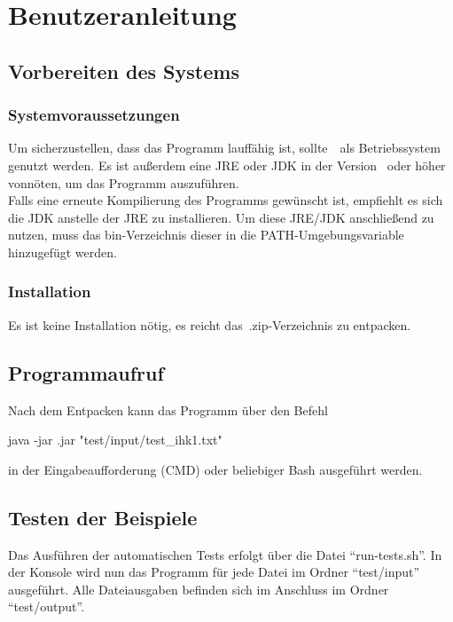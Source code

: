\chapter{Benutzeranleitung}\label{ch:benutzeranleitung}


\section{Vorbereiten des Systems}\label{sec:vorbereiten-des-systems}

\subsection{Systemvoraussetzungen}\label{subsec:systemvoraussetzungen}
Um sicherzustellen, dass das Programm lauffähig ist, sollte~\Betriebssystem~als Betriebssystem genutzt werden.
Es ist außerdem eine JRE oder JDK in der Version \JavaVersion~oder höher vonnöten, um das Programm auszuführen.\\
Falls eine erneute Kompilierung des Programms gewünscht ist, empfiehlt es sich die JDK anstelle der JRE zu installieren.
Um diese JRE/JDK anschließend zu nutzen, muss das bin-Verzeichnis dieser in die PATH-Umgebungsvariable hinzugefügt werden.
\subsection{Installation}\label{subsec:installation}
Es ist keine Installation nötig, es reicht das~.zip-Verzeichnis zu entpacken.

\section{Programmaufruf}\label{sec:programmaufruf}
Nach dem Entpacken kann das Programm über den Befehl
\begin{center}
    \colorbox{gray!20}{
        \begin{minipage}{0.9\textwidth}
            java -jar \Artifact.jar "test/input/test\_ihk1.txt"
        \end{minipage}
    }
\end{center}
in der Eingabeaufforderung (CMD) oder beliebiger Bash ausgeführt werden.
\section{Testen der Beispiele}\label{sec:testen-der-beispiele}
Das Ausführen der automatischen Tests erfolgt über die Datei \enquote{run-tests.sh}.
In der Konsole wird nun das Programm für jede Datei im Ordner \enquote{test/input} ausgeführt.
Alle Dateiausgaben befinden sich im Anschluss im Ordner \enquote{test/output}.

